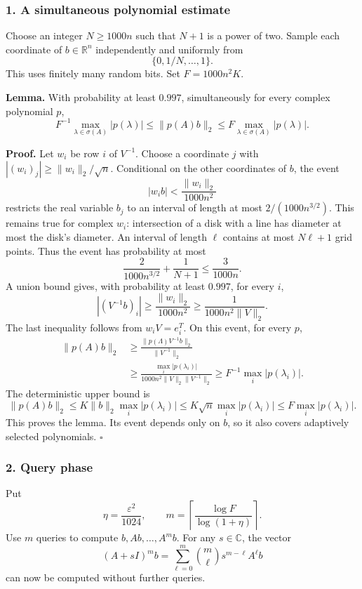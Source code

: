 \documentclass[10pt,a4paper]{article}
\begin{document}
\subsubsection{1. A simultaneous polynomial
estimate}\label{a-simultaneous-polynomial-estimate}

Choose an integer \(N\ge1000n\) such that \(N+1\) is a power of two.
Sample each coordinate of \(b\in\mathbb R^n\) independently and
uniformly from \[
\{0,1/N,\ldots,1\}.
\] This uses finitely many random bits. Set \(F=1000n^2K\).

\textbf{Lemma.} With probability at least \(0.997\), simultaneously for
every complex polynomial \(p\), \[
F^{-1}\max_{\lambda\in\sigma(A)}|p(\lambda)|
\le\|p(A)b\|_2
\le F\max_{\lambda\in\sigma(A)}|p(\lambda)|.
\]

\textbf{Proof.} Let \(w_i\) be row \(i\) of \(V^{-1}\). Choose a
coordinate \(j\) with \(|(w_i)_j|\ge\|w_i\|_2/\sqrt n\). Conditional on
the other coordinates of \(b\), the event \[
|w_ib|<\frac{\|w_i\|_2}{1000n^2}
\] restricts the real variable \(b_j\) to an interval of length at most
\(2/(1000n^{3/2})\). This remains true for complex \(w_i\): intersection
of a disk with a line has diameter at most the disk's diameter. An
interval of length \(\ell\) contains at most \(N\ell+1\) grid points.
Thus the event has probability at most \[
\frac{2}{1000n^{3/2}}+\frac1{N+1}\le\frac3{1000n}.
\] A union bound gives, with probability at least \(0.997\), for every
\(i\), \[
|(V^{-1}b)_i|\ge\frac{\|w_i\|_2}{1000n^2}
\ge\frac1{1000n^2\|V\|_2}.
\] The last inequality follows from \(w_iV=e_i^T\). On this event, for
every \(p\), \[
\begin{aligned}
\|p(A)b\|_2
&\ge\frac{\|p(\Lambda)V^{-1}b\|_2}{\|V^{-1}\|_2}\\
&\ge\frac{\max_i|p(\lambda_i)|}
 {1000n^2\|V\|_2\|V^{-1}\|_2}
\ge F^{-1}\max_i|p(\lambda_i)|.
\end{aligned}
\] The deterministic upper bound is \[
\|p(A)b\|_2\le K\|b\|_2\max_i|p(\lambda_i)|
\le K\sqrt n\max_i|p(\lambda_i)|\le F\max_i|p(\lambda_i)|.
\] This proves the lemma. Its event depends only on \(b\), so it also
covers adaptively selected polynomials. \(\square\)

\subsubsection{2. Query phase}\label{query-phase}

Put \[
\eta=\frac{\varepsilon^2}{1024},\qquad
m=\left\lceil\frac{\log F}{\log(1+\eta)}\right\rceil.
\] Use \(m\) queries to compute \(b,Ab,\ldots,A^mb\). For any
\(s\in\mathbb C\), the vector \[
(A+sI)^mb=\sum_{\ell=0}^m\binom m\ell s^{m-\ell}A^\ell b
\] can now be computed without further queries.
\end{document}
